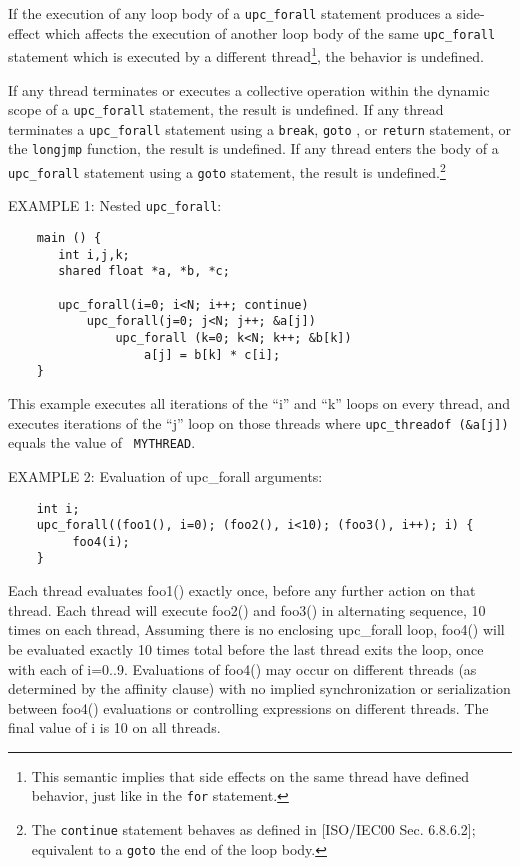 \np If the execution of any loop body of a {\tt upc\_forall} statement
    produces a side-effect which affects the execution of another loop
    body of the same {\tt upc\_forall} statement which is executed by a different
    thread\footnote{This semantic implies that side effects on the same thread 
    have defined behavior, just like in the {\tt for} statement.}, the behavior is
    undefined.

\np If any thread terminates or executes a collective operation
   within the dynamic scope of a {\tt upc\_forall}
   statement, the result is undefined. If any thread terminates
   a  {\tt upc\_forall}  statement using a {\tt break},
   {\tt goto} , or {\tt return} statement, or the {\tt longjmp} function,
   the result is undefined.
   If any thread enters the body of a {\tt upc\_forall} statement
   using a {\tt goto} statement, the result is undefined.\footnote{The
   {\tt continue} statement behaves as defined in [ISO/IEC00 Sec. 
   6.8.6.2]; equivalent to a {\tt goto} the end of the loop body.}

\np EXAMPLE 1: Nested {\tt upc\_forall}: 

\begin{verbatim}
    main () { 
       int i,j,k; 
       shared float *a, *b, *c; 
    
       upc_forall(i=0; i<N; i++; continue) 
           upc_forall(j=0; j<N; j++; &a[j]) 
               upc_forall (k=0; k<N; k++; &b[k]) 
                   a[j] = b[k] * c[i]; 
    } 
\end{verbatim}

   This example executes all iterations of the ``i'' and ``k'' loops
   on every thread, and executes iterations of the ``j'' loop on those
   threads where {\tt upc\_threadof (\&a[j])} equals the value of {\tt
   MYTHREAD}.
   
\np EXAMPLE 2: Evaluation of upc\_forall arguments:

\begin{verbatim}
    int i;
    upc_forall((foo1(), i=0); (foo2(), i<10); (foo3(), i++); i) {
         foo4(i);
    }
\end{verbatim}
   Each thread evaluates foo1() exactly once, before any further action on that
   thread. Each thread will execute foo2() and foo3() in alternating sequence, 
   10 times on each thread,
   Assuming there is no enclosing upc\_forall loop, 
   foo4() will be evaluated exactly 10 times total before the last thread exits the 
   loop, once with each of i=0..9. Evaluations of foo4() may occur on different 
   threads (as determined by the affinity clause) with no implied synchronization 
   or serialization between foo4() evaluations or controlling expressions on 
   different threads. The final value of i is 10 on all threads.


